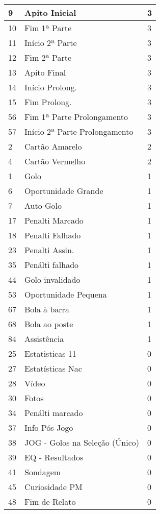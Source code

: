 \begin{longtable}{| p{} | p{} | p{} |}
    9 & Apito Inicial & 3 \\ \hline
    10 & Fim 1ª Parte & 3 \\ \hline
    11 & Início 2ª Parte & 3 \\ \hline
    12 & Fim 2ª Parte & 3 \\ \hline
    13 & Apito Final & 3 \\ \hline
    14 & Início Prolong. & 3 \\ \hline
    15 & Fim Prolong. & 3 \\ \hline
    56 & Fim 1ª Parte Prolongamento & 3 \\ \hline
    57 & Início 2ª Parte Prolongamento & 3 \\ \hline
    2 & Cartão Amarelo & 2 \\ \hline
    4 & Cartão Vermelho & 2 \\ \hline
    1 & Golo & 1 \\ \hline
    6 & Oportunidade Grande & 1 \\ \hline
    7 & Auto-Golo & 1 \\ \hline
    17 & Penalti Marcado & 1 \\ \hline
    18 & Penalti Falhado & 1 \\ \hline
    23 & Penalti Assin. & 1 \\ \hline
    35 & Penálti falhado & 1 \\ \hline
    44 & Golo invalidado & 1 \\ \hline
    53 & Oportunidade Pequena & 1 \\ \hline
    67 & Bola à barra & 1 \\ \hline
    68 & Bola ao poste & 1 \\ \hline
    84 & Assistência & 1 \\ \hline
    25 & Estatisticas 11 & 0 \\ \hline
    27 & Estatísticas Nac & 0 \\ \hline
    28 & Vídeo & 0 \\ \hline
    30 & Fotos & 0 \\ \hline
    34 & Penálti marcado & 0 \\ \hline
    37 & Info Pós-Jogo & 0 \\ \hline
    38 & JOG - Golos na Seleção (Único) & 0 \\ \hline
    39 & EQ - Resultados & 0 \\ \hline
    41 & Sondagem & 0 \\ \hline
    45 & Curiosidade PM & 0 \\ \hline
    48 & Fim de Relato & 0 \\ \hline

\end{longtable}
